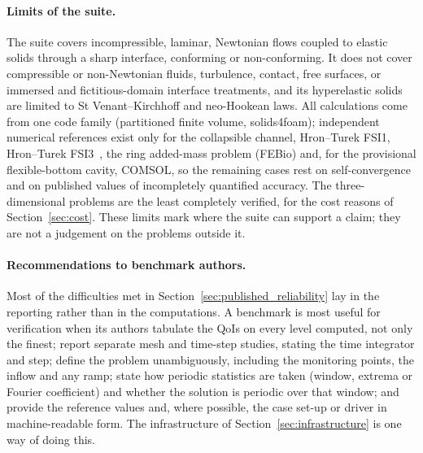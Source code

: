 \paragraph{Limits of the suite.}
The suite covers incompressible, laminar, Newtonian flows coupled to elastic solids through a sharp interface, conforming or non-conforming.
It does not cover compressible or non-Newtonian fluids, turbulence, contact, free surfaces, or immersed and fictitious-domain interface treatments, and its hyperelastic solids are limited to St Venant--Kirchhoff and neo-Hookean laws.
All calculations come from one code family (partitioned finite volume, solids4foam); independent numerical references exist only for the collapsible channel, Hron--Turek FSI1, Hron--Turek FSI3~\citep{Failer2020}, the ring added-mass problem (FEBio) and, for the provisional flexible-bottom cavity, COMSOL, so the remaining cases rest on self-convergence and on published values of incompletely quantified accuracy.
The three-dimensional problems are the least completely verified, for the cost reasons of Section~\ref{sec:cost}.
These limits mark where the suite can support a claim; they are not a judgement on the problems outside it.

\paragraph{Recommendations to benchmark authors.}
Most of the difficulties met in Section~\ref{sec:published_reliability} lay in the reporting rather than in the computations.
A benchmark is most useful for verification when its authors tabulate the QoIs on every level computed, not only the finest; report separate mesh and time-step studies, stating the time integrator and step; define the problem unambiguously, including the monitoring points, the inflow and any ramp; state how periodic statistics are taken (window, extrema or Fourier coefficient) and whether the solution is periodic over that window; and provide the reference values and, where possible, the case set-up or driver in machine-readable form.
The infrastructure of Section~\ref{sec:infrastructure} is one way of doing this.
